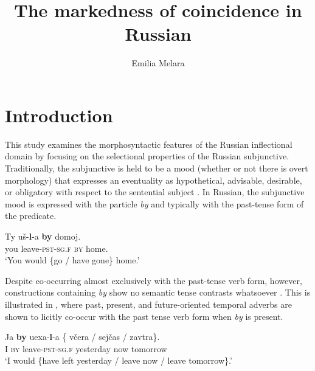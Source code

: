 \documentclass[output=paper,
modfonts,
newtxmath,
hidelinks,
]{langscibook}
\title{The markedness of coincidence in Russian}
\author{%
 Emilia Melara\affiliation{University of Toronto}
}
\begin{document}
\maketitle
{}



\section{Introduction}\label{10:s1}


This study examines the morphosyntactic features of the Russian inflectional domain by focusing on the selectional properties of the Russian subjunctive. Traditionally, the subjunctive is held to be a mood (whether or not there is overt morphology) that expresses an eventuality as hypothetical, advisable, desirable, or obligatory with respect to the sentential subject  \citep[142]{HarrisonLeFleming2000}. In Russian, the subjunctive mood is expressed with the particle \textit{by} and typically with the past-tense form of the predicate.

\ea \label{10:ex1}
\gll Ty uš-\textbf{l}{}-a \textbf{by} domoj.\\
     you leave\textsc{-pst-sg.f} \textsc{by} home.\\
\glt `You would \{go / have gone\} home.' \hfill \citep[152]{Mezhevich2006}
\z

\noindent Despite co-occurring almost exclusively with the past-tense verb form, however, constructions containing \textit{by} show no semantic tense contrasts whatsoever \citep[298]{Spencer2001}. This is illustrated in , where past, present, and future-oriented temporal adverbs are shown to licitly co-occur with the past tense verb form when \textit{by} is present. 

\ea \label{10:ex2}
\gll Ja \textbf{by} uexa-\textbf{l}{}-a \{\hspace{-2pt} včera / sejčas / zavtra\}.\\
     I \textsc{by} leave\textsc{-pst-sg.f} {} yesterday {} now {} tomorrow\\
\glt `I would \{have left yesterday / leave now / leave tomorrow\}.'\\
\hfill \citep[136]{Mezhevich2006}
\z
\end{document}
